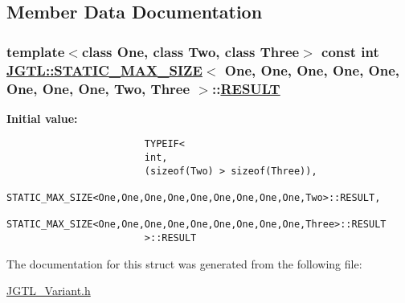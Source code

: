 \subsection{Member Data Documentation}
\hypertarget{struct_j_g_t_l_1_1_s_t_a_t_i_c___m_a_x___s_i_z_e_3_01_one_00_01_one_00_01_one_00_01_one_00_01_on0da18bc47224201889d1e0cafe760a2c_bca6174e9e13911ee264d948a915d565}{
\subsubsection[RESULT]{\setlength{\rightskip}{0pt plus 5cm}template$<$class One, class Two, class Three$>$ const int \hyperlink{struct_j_g_t_l_1_1_s_t_a_t_i_c___m_a_x___s_i_z_e}{JGTL::STATIC\_\-MAX\_\-SIZE}$<$ One, One, One, One, One, One, One, One, Two, Three $>$::\hyperlink{struct_j_g_t_l_1_1_s_t_a_t_i_c___m_a_x___s_i_z_e_3_01_one_00_01_one_00_01_one_00_01_one_00_01_on0da18bc47224201889d1e0cafe760a2c_bca6174e9e13911ee264d948a915d565}{RESULT}}}
\label{struct_j_g_t_l_1_1_s_t_a_t_i_c___m_a_x___s_i_z_e_3_01_one_00_01_one_00_01_one_00_01_one_00_01_on0da18bc47224201889d1e0cafe760a2c_bca6174e9e13911ee264d948a915d565}


\textbf{Initial value:}

\begin{Code}\begin{verbatim}
                        TYPEIF<
                        int,
                        (sizeof(Two) > sizeof(Three)),
                        STATIC_MAX_SIZE<One,One,One,One,One,One,One,One,One,Two>::RESULT,
                        STATIC_MAX_SIZE<One,One,One,One,One,One,One,One,One,Three>::RESULT
                        >::RESULT
\end{verbatim}\end{Code}


The documentation for this struct was generated from the following file:\begin{CompactItemize}
\item 
\hyperlink{_j_g_t_l___variant_8h}{JGTL\_\-Variant.h}\end{CompactItemize}
